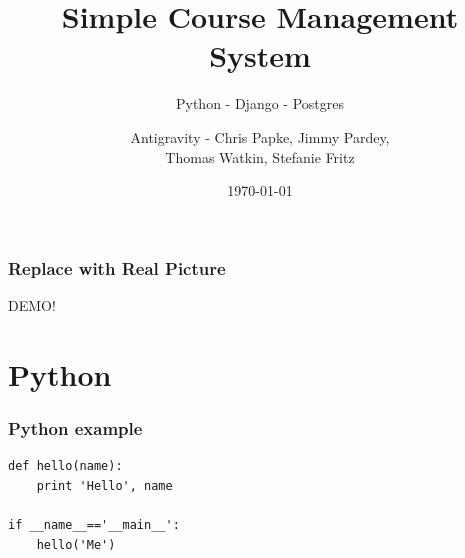 \documentclass{beamer}
\begin{document}
\title[Group Project]{Simple Course Management System}
\subtitle{Python - Django - Postgres}
\author{Antigravity - Chris Papke, Jimmy Pardey, \\Thomas Watkin, Stefanie Fritz}
\date{\today}

\begin{frame}[plain]
\titlepage
\end{frame}

{
%
\begin{frame}[fragile]
\frametitle{Replace with Real Picture}

\begin{center}
	DEMO!
\end{center}

\end{frame}
}

\section{Python}
\begin{frame}[fragile]
\frametitle{Python example}

\begin{lstlisting}
def hello(name):
    print 'Hello', name
 
if __name__=='__main__':
    hello('Me')   
\end{lstlisting}
\end{frame}
\end{document}
